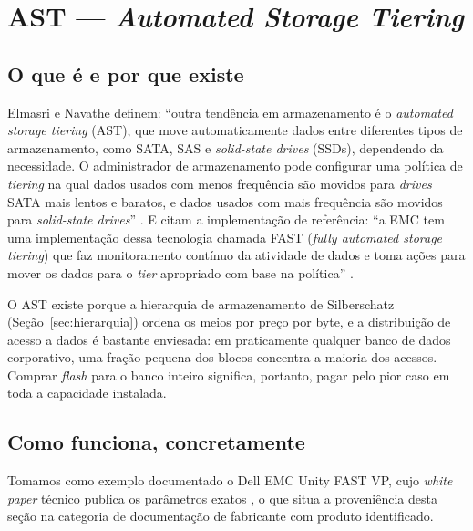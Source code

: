 \documentclass[11pt,a4paper]{article}
\begin{document}
\section{AST --- \textit{Automated Storage Tiering}}
\label{sec:ast}

\subsection{O que é e por que existe}

Elmasri e Navathe definem: ``outra tendência em armazenamento é o \textit{automated storage
tiering} (AST), que move automaticamente dados entre diferentes tipos de armazenamento, como SATA,
SAS e \textit{solid-state drives} (SSDs), dependendo da necessidade. O administrador de
armazenamento pode configurar uma política de \textit{tiering} na qual dados usados com menos
frequência são movidos para \textit{drives} SATA mais lentos e baratos, e dados usados com mais
frequência são movidos para \textit{solid-state drives}'' \cite{elmasri2018}. E citam a
implementação de referência: ``a EMC tem uma implementação dessa tecnologia chamada FAST (\textit{fully
automated storage tiering}) que faz monitoramento contínuo da atividade de dados e toma ações para
mover os dados para o \textit{tier} apropriado com base na política'' \cite{elmasri2018}.

O AST existe porque a hierarquia de armazenamento de Silberschatz (Seção~\ref{sec:hierarquia})
ordena os meios por preço por byte, e a distribuição de acesso a dados é bastante enviesada: em
praticamente qualquer banco de dados corporativo, uma fração pequena dos blocos concentra a maioria
dos acessos. Comprar \textit{flash} para o banco inteiro significa, portanto, pagar pelo pior caso
em toda a capacidade instalada.

\subsection{Como funciona, concretamente}

Tomamos como exemplo documentado o Dell EMC Unity FAST VP, cujo \textit{white paper} técnico
publica os parâmetros exatos \cite{dellfast}, o que situa a proveniência desta seção na categoria de
documentação de fabricante com produto identificado.
\end{document}
